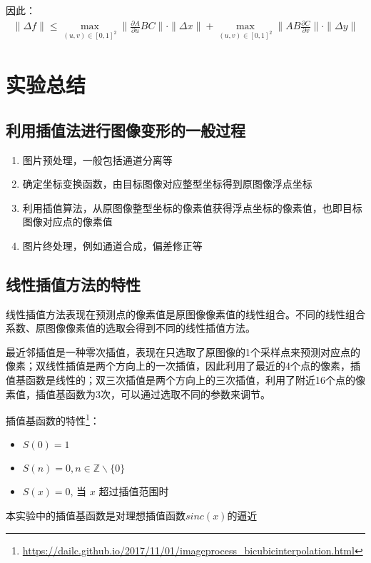 \documentclass{article}
\begin{document}
因此：
\begin{equation}
	\begin{aligned}
		\| \Delta f\| \leqslant \max_{(u,v)\in [0,1]^{2}}{\|\frac{\partial A}{\partial u}BC\|}\cdot \|\Delta x\| 
		+ \max_{(u,v)\in [0,1]^{2}}{\|AB\frac{\partial C}{\partial v}\|}\cdot \|\Delta y\|
	\end{aligned}
\end{equation}

\section{实验总结}
\subsection{利用插值法进行图像变形的一般过程}
\begin{enumerate}
	\item 图片预处理，一般包括通道分离等
	\item 确定坐标变换函数，由目标图像对应整型坐标得到原图像浮点坐标
	\item 利用插值算法，从原图像整型坐标的像素值获得浮点坐标的像素值，也即目标图像对应点的像素值
	\item 图片终处理，例如通道合成，偏差修正等
\end{enumerate}

\subsection{线性插值方法的特性}
线性插值方法表现在预测点的像素值是原图像像素值的线性组合。不同的线性组合系数、原图像像素值的选取会得到不同的线性插值方法。

最近邻插值是一种零次插值，表现在只选取了原图像的1个采样点来预测对应点的像素；双线性插值是两个方向上的一次插值，因此利用了最近的4个点的像素，插值基函数是线性的；双三次插值是两个方向上的三次插值，利用了附近16个点的像素值，插值基函数为3次，可以通过选取不同的参数来调节。

插值基函数的特性\footnote{\url{https://dailc.github.io/2017/11/01/imageprocess_bicubicinterpolation.html}}：
\begin{itemize}
	\item $S(0) = 1$
	\item $S(n) = 0 , n \in \mathbb{Z}\backslash\{0\}$
	\item $S(x) = 0$, 当 $x$ 超过插值范围时
\end{itemize}

本实验中的插值基函数是对理想插值函数$sinc(x)$的逼近
\end{document}

